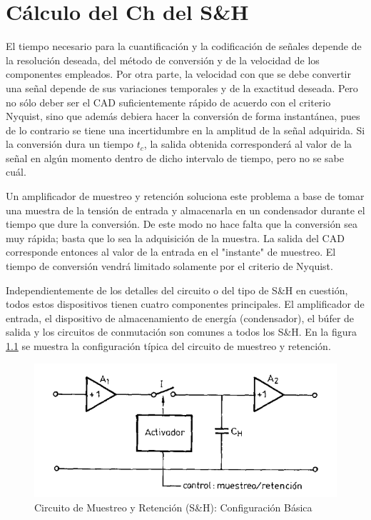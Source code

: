 \chapter{Cálculo del Ch del S\&H}

El tiempo necesario para la cuantificación y la codificación de señales depende de la resolución deseada, del método de conversión y de la velocidad de los componentes empleados. Por otra parte, la velocidad con que se debe convertir una señal depende de sus variaciones temporales y de la exactitud deseada. Pero no sólo deber ser el CAD suficientemente rápido de acuerdo con el criterio Nyquist, sino que además debiera hacer la conversión de forma instantánea, pues de lo contrario se tiene una incertidumbre en la amplitud de la señal adquirida. Si la conversión dura un tiempo $t_c$, la salida obtenida corresponderá al valor de la señal en algún momento dentro de dicho intervalo de tiempo, pero no se sabe cuál. \par
\vspace{0.25cm}
Un amplificador de muestreo y retención soluciona este problema a base de tomar una muestra de la tensión de entrada y almacenarla en un condensador durante el tiempo que dure la conversión. De este modo no hace falta que la conversión sea muy rápida; basta que lo sea la adquisición de la muestra. La salida del CAD corresponde entonces al valor de la entrada en el "instante" de muestreo. El tiempo de conversión vendrá limitado solamente por el criterio de Nyquist. \par
\vspace{0.25cm}
Independientemente de los detalles del circuito o del tipo de S\&H en cuestión, todos estos dispositivos tienen cuatro componentes principales. El amplificador de entrada, el dispositivo de almacenamiento de energía (condensador), el búfer de salida y los circuitos de conmutación son comunes a todos los S\&H. En la figura \ref{fig:muestreo-retencion} se muestra la configuración típica del circuito de muestreo y retención.

\begin{figure}[H]
    \centering
    \includegraphics[width=0.5\linewidth]{Imagenes/S&H.png}
    \caption{Circuito de Muestreo y Retención (S\&H): Configuración Básica}
    \label{fig:muestreo-retencion}
\end{figure}

